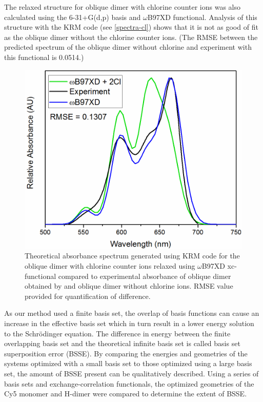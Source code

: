 The relaxed structure for oblique dimer with chlorine counter ions was also calculated using the 6-31+G(d,p) basis and $\omega$B97XD functional. Analysis of this structure with the KRM code (see \autoref{spectra-cl}) shows that it is not as good of fit as the oblique dimer without the chlorine counter ions. (The RMSE between the predicted spectrum of the oblique dimer without chlorine and experiment with this functional is 0.0514.)
\begin{figure}[h!]
  \centering
  \includegraphics[width=0.8\linewidth]{figures/pub1/ob-dimer-Cl-wB97XD.pdf}
  \caption{Theoretical absorbance spectrum generated using KRM code for the oblique dimer with chlorine counter ions relaxed using $\omega$B97XD xc-functional compared to experimental absorbance of oblique dimer obtained by \citet{Cannon2017} and oblique dimer without chlorine ions. RMSE value provided for quantification of difference.}\label{spectra-cl}
\end{figure}

As our method used a finite basis set, the overlap of basis functions can cause an increase in the effective basis set which in turn result in a lower energy solution to the Schrödinger equation. The difference in energy between the finite overlapping basis set and the theoretical infinite basis set is called basis set superposition error (BSSE). By comparing the energies and geometries of the systems optimized with a small basis set to those optimized using a large basis set, the amount of BSSE present can be qualitatively described. Using a series of basis sets and exchange-correlation functionals, the optimized geometries of the Cy5 monomer and H-dimer were compared to determine the extent of BSSE. 


